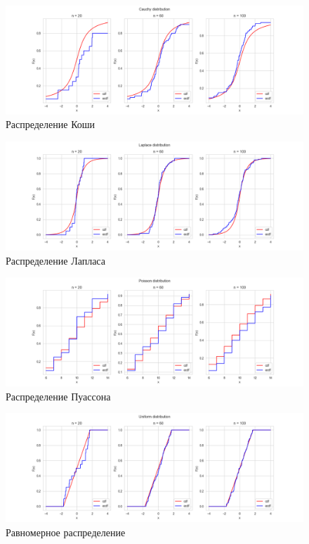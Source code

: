 \documentclass[12pt,a4paper]{article}
\begin{document}
\begin{figure}[H]
    \centering
    \includegraphics[scale=0.5]{images/Cauchy.png}
    \caption{Распределение Коши}
\end{figure}

\begin{figure}[H]
    \centering
    \includegraphics[scale=0.5]{images/Laplace.png}
    \caption{Распределение Лапласа}
\end{figure}

\begin{figure}[H]
    \centering
    \includegraphics[scale=0.5]{images/Poisson.png}
    \caption{Распределение Пуассона}
\end{figure}

\begin{figure}[H]
    \centering
    \includegraphics[scale=0.5]{images/Uniform.png}
    \caption{Равномерное распределение}
\end{figure}
\end{document}
